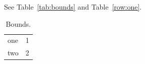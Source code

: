 \documentclass{article}
\begin{document}
See Table~\ref{tab:bounds} and Table~\ref{row:one}.
\begin{longtable}{lr}
\caption{Bounds.}\label{tab:bounds}\\
one & \label{row:one} 1\\
two & \label{row:two} 2\\
\end{longtable}
\end{document}
